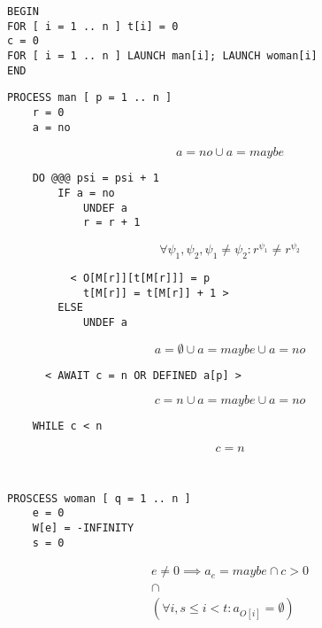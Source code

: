 \documentclass{article}
\begin{document}
\begin{verbatim}
BEGIN
FOR [ i = 1 .. n ] t[i] = 0
c = 0
FOR [ i = 1 .. n ] LAUNCH man[i]; LAUNCH woman[i]
END

\end{verbatim}
\newpage
\begin{verbatim}
PROCESS man [ p = 1 .. n ]
    r = 0
    a = no
\end{verbatim}
\begin{displaymath}
a = no \cup a = maybe
\end{displaymath}
\begin{verbatim}
    DO @@@ psi = psi + 1
        IF a = no
            UNDEF a
            r = r + 1
\end{verbatim}
\begin{displaymath}
\forall \psi_1, \psi_2, \psi_1 \neq \psi_2 : r^{\psi_1} \neq r^{\psi_2}
\end{displaymath}
\begin{verbatim}
          < O[M[r]][t[M[r]]] = p
            t[M[r]] = t[M[r]] + 1 >
        ELSE
            UNDEF a
\end{verbatim}
\begin{displaymath}
a = \emptyset \cup a = maybe \cup a = no
\end{displaymath}
\begin{verbatim}
      < AWAIT c = n OR DEFINED a[p] >
\end{verbatim}
\begin{displaymath}
c = n \cup a = maybe \cup a = no
\end{displaymath}
\begin{verbatim}
    WHILE c < n
\end{verbatim}
\begin{displaymath}
c = n
\end{displaymath}
\begin{verbatim}

\end{verbatim}
\newpage
\begin{verbatim}

PROSCESS woman [ q = 1 .. n ]
    e = 0
    W[e] = -INFINITY
    s = 0
\end{verbatim}
\begin{displaymath}
\begin{matrix}
e \neq 0 \implies a_e = maybe \cap c > 0 \\
\cap \\
(\forall i, s \leq i < t : a_{O[i]} = \emptyset)
\end{matrix}
\end{displaymath}
\end{document}
